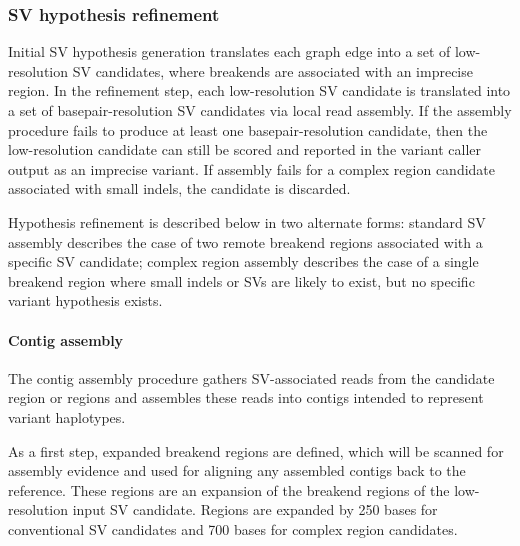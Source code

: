 \documentclass{article}
\begin{document}
\subsubsection{SV hypothesis refinement}

Initial SV hypothesis generation translates each graph edge into a set of low-resolution SV candidates, where breakends are associated with an imprecise region. In the refinement step, each low-resolution SV candidate is translated into a set of basepair-resolution SV candidates via local read assembly. If the assembly procedure fails to produce at least one basepair-resolution candidate, then the low-resolution candidate can still be scored and reported in the variant caller output as an imprecise variant. If assembly fails for a complex region candidate associated with small indels, the candidate is discarded.

Hypothesis refinement is described below in two alternate forms: standard SV assembly describes the case of two remote breakend regions associated with a specific SV candidate; complex region assembly describes the case of a single breakend region where small indels or SVs are likely to exist, but no specific variant hypothesis exists.

\paragraph{Contig assembly}

The contig assembly procedure gathers SV-associated reads from the candidate region or regions and assembles these reads into contigs intended to represent variant haplotypes.

As a first step, expanded breakend regions are defined, which will be scanned for assembly evidence and used for aligning any assembled contigs back to the reference. These regions are an expansion of the breakend regions of the low-resolution input SV candidate. Regions are expanded by 250 bases for conventional SV candidates and 700 bases for complex region candidates.
\end{document}
